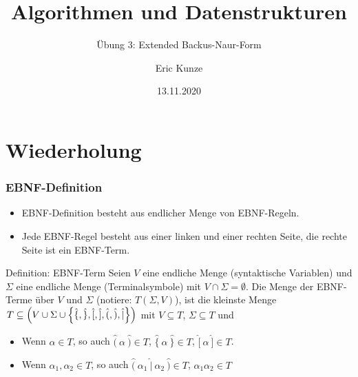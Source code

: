 \documentclass{beamer}
\newcommand{\wdh}[1]{\hat{\{} \ #1 \ \hat{\}}}
\newcommand{\opt}[2]{\hat{(} \ #1 \ \hat{|} \ #2 \ \hat{)}}
\newcommand{\byp}[1]{\hat{[} \ #1 \ \hat{]}}
\newcommand{\rdb}[1]{\hat{(} \ #1 \ \hat{)}}
\begin{document}
	
	\title{Algorithmen und Datenstrukturen}
	\subtitle{Übung 3: Extended Backus-Naur-Form}
	\author{Eric Kunze}
	\date{13.11.2020}

	\maketitle



\section{Wiederholung}

\begin{frame} \frametitle{EBNF-Definition}
	\small
	\begin{itemize}
		\item EBNF-Definition besteht aus endlicher Menge von EBNF-Regeln.
		\item Jede EBNF-Regel besteht aus einer linken und einer rechten Seite, die rechte Seite ist ein EBNF-Term.
	\end{itemize}
	\pause
	\begin{block}{Definition: EBNF-Term}
		Seien $V$ eine endliche Menge (syntaktische Variablen) und $\Sigma$ eine endliche Menge (Terminalsymbole) mit $V \cap \Sigma = \emptyset$. Die Menge der EBNF-Terme über $V$ und $\Sigma$ (notiere: $T(\Sigma, V)$), ist die kleinste Menge $T \subseteq \left( V \cup \Sigma \cup \left\{ \hat{\{}, \hat{\}}, \hat{[}, \hat{]}, \hat{(}, \hat{)}, \hat{|} \right\} \right)$ mit $V \subseteq T$, $\Sigma \subseteq T$ und
		\begin{itemize}
			\item Wenn $\alpha \in T$, so auch $\rdb{\alpha} \in T$, $\wdh{\alpha} \in T$, $\byp{\alpha} \in T$.
			\item Wenn $\alpha_1, \alpha_2 \in T$, so auch $\opt{\alpha_1}{\alpha_2} \in T$, $\alpha_1 \alpha_2 \in T$
		\end{itemize}
	\end{block}
\end{frame}
\end{document}
